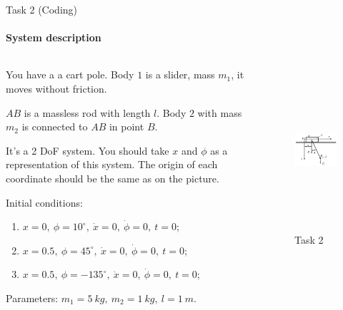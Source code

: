 \documentclass[aspectratio=169]{beamer}
\begin{document}
\begin{frame}[t]{Task 2 (Coding)}
  \framesubtitle{System description}
  \vspace{-0.6cm}
    \begin{columns}[T,onlytextwidth]
      \begin{column}{0.64\textwidth}
        \footnotesize
        You have a a cart pole. Body $1$ is a slider, mass $m_1$, it moves without friction.

        $AB$ is a massless rod with length $l$. Body $2$ with mass $m_2$ is connected to $AB$ in point $B$.
        \medskip

        It's a 2 DoF system. You should take $x$ and $\phi$ as a representation of this system. The origin of each coordinate should be the same as on the picture.
        \medskip

        Initial conditions:
        \begin{enumerate}
          \item $x = 0,\ \phi = 10^\circ,\ \dot{x} = 0,\ \dot{\phi} = 0,\ t=0$;
          \item $x = 0.5,\ \phi = 45^\circ,\ \dot{x} = 0,\ \dot{\phi} = 0,\ t=0$;
          \item $x = 0.5,\ \phi = -135^\circ,\ \dot{x} = 0,\ \dot{\phi} = 0,\ t=0$;
        \end{enumerate}
        Parameters: $m_1 = 5\ kg,\ m_2 = 1\ kg,\ l = 1\ m$.

      \end{column}
      \begin{column}{0.34\textwidth}
        \begin{figure}[H]
          \centering\includegraphics[height=6cm,width=1\textwidth,keepaspectratio]{HW7_2.png}
          \caption*{Task 2}
          \label{fig:HW7_2.png}
        \end{figure}
      \end{column}
    \end{columns}
  \end{frame}
\end{document}
